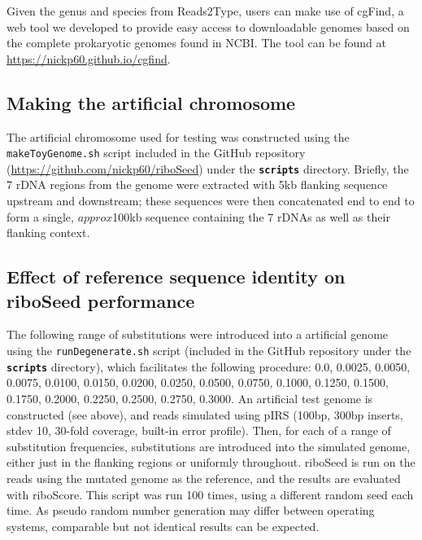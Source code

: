 Given the genus and species from Reads2Type, users can make use of cgFind, a web tool we developed to provide easy access to downloadable genomes based on the complete prokaryotic genomes found in NCBI. The tool can be found at \href{https://nickp60.github.io/cgfind}{https://nickp60.github.io/cgfind}.


\subsection*{Making the artificial chromosome}
The artificial chromosome used for testing was constructed using the \texttt{makeToyGenome.sh} script included in the GitHub repository (\url{https://github.com/nickp60/riboSeed}) under the \textbf{\texttt{scripts}} directory. Briefly, the 7 rDNA regions from the  genome were extracted with 5kb flanking sequence upstream and downstream; these sequences were then concatenated end to end to form a single, $approx$100kb sequence containing the 7 rDNAs as well as their flanking context.


\subsection*{Effect of reference sequence identity on riboSeed performance}
The following range of substitutions were introduced into a artificial genome using the \texttt{runDegenerate.sh} script (included in the GitHub repository under the \textbf{\texttt{scripts}} directory), which facilitates the following procedure: 0.0, 0.0025, 0.0050, 0.0075, 0.0100, 0.0150, 0.0200, 0.0250, 0.0500, 0.0750, 0.1000, 0.1250, 0.1500, 0.1750, 0.2000, 0.2250, 0.2500, 0.2750, 0.3000. An artificial test genome is constructed (see above), and reads simulated using pIRS (100bp, 300bp inserts, stdev 10, 30-fold coverage, built-in error profile).  Then, for each of a range of substitution frequencies, substitutions are introduced into the simulated genome, either just in the flanking regions or uniformly throughout. riboSeed is run on the reads using the mutated genome as the reference, and the results are evaluated with riboScore. This script was run 100 times, using a different random seed each time.  As pseudo random number generation may differ between operating systems, comparable but not identical results can be expected.
